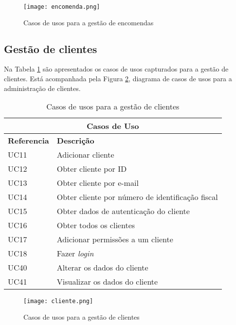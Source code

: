 \begin{figure}[H]
    \centering
    \texttt{[image: encomenda.png]}
    \caption{Casos de usos para a gestão de encomendas}
    \label{fig:encomendas}
\end{figure}

\newpage

\subsection{Gestão de clientes}

Na Tabela \ref{table:clientes} são apresentados os casos de usos capturados para a gestão de clientes. Está acompanhada pela Figura \ref{fig:clientes}, diagrama de casos de usos para a administração de clientes.

\begin{table}[H]
\caption{Casos de usos para a gestão de clientes}
\label{table:clientes}
\begin{center}
\begin{tabular}{ |p{2cm}|p{10cm}|  }
\hline
\multicolumn{2}{|c|}{Casos de Uso} \\
\hline
\textbf{Referencia} & \textbf{Descrição} \\
\hline
UC11 & Adicionar cliente\\
\hline
UC12 & Obter cliente por ID\\
\hline
UC13 & Obter cliente por e-mail\\
\hline
UC14 & Obter cliente por número de identificação fiscal\\
\hline
UC15 & Obter dados de autenticação do cliente\\
\hline
UC16 & Obter todos os clientes\\
\hline
UC17 & Adicionar permissões a um cliente\\
\hline
UC18 & Fazer \textit{login}\\
\hline
UC40 & Alterar os dados do cliente\\
\hline
UC41 & Visualizar os dados do cliente\\


\hline
\end{tabular} 
\end{center}
\end{table}

\begin{figure}[H]
    \centering
    \texttt{[image: cliente.png]}
    \caption{Casos de usos para a gestão de clientes}
    \label{fig:clientes}
\end{figure}

